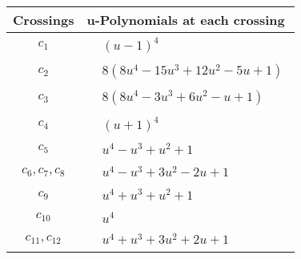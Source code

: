 \documentclass[1p]{elsarticle_modified}
\theoremstyle{definition}
\begin{document}
\begin{tabular}{m{50pt}|m{274pt}}
Crossings & \hspace{64pt}u-Polynomials at each crossing \\
\hline $$\begin{aligned}c_{1}\end{aligned}$$&$\begin{aligned}
&(u-1)^4
\end{aligned}$\\
\hline $$\begin{aligned}c_{2}\end{aligned}$$&$\begin{aligned}
&8(8 u^4-15 u^3+12 u^2-5 u+1)
\end{aligned}$\\
\hline $$\begin{aligned}c_{3}\end{aligned}$$&$\begin{aligned}
&8(8 u^4-3 u^3+6 u^2- u+1)
\end{aligned}$\\
\hline $$\begin{aligned}c_{4}\end{aligned}$$&$\begin{aligned}
&(u+1)^4
\end{aligned}$\\
\hline $$\begin{aligned}c_{5}\end{aligned}$$&$\begin{aligned}
&u^4- u^3+u^2+1
\end{aligned}$\\
\hline $$\begin{aligned}c_{6},c_{7},c_{8}\end{aligned}$$&$\begin{aligned}
&u^4- u^3+3 u^2-2 u+1
\end{aligned}$\\
\hline $$\begin{aligned}c_{9}\end{aligned}$$&$\begin{aligned}
&u^4+u^3+u^2+1
\end{aligned}$\\
\hline $$\begin{aligned}c_{10}\end{aligned}$$&$\begin{aligned}
&u^4
\end{aligned}$\\
\hline $$\begin{aligned}c_{11},c_{12}\end{aligned}$$&$\begin{aligned}
&u^4+u^3+3 u^2+2 u+1
\end{aligned}$\\
\hline
\end{tabular}\\~\\
\end{document}
